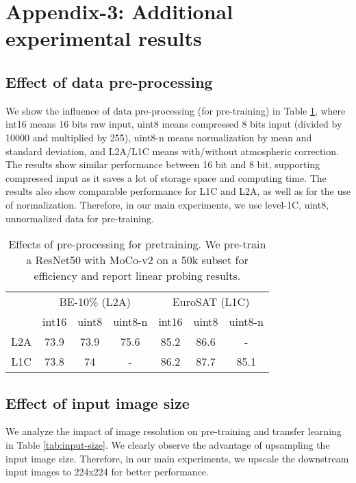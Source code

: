 \documentclass[lettersize,journal]{IEEEtran}
\begin{document}
\clearpage
\section*{\large\textbf{Appendix-3: Additional experimental results}}
\vspace{1em}

\label{subsec:pre-process}
\setcounter{subsection}{0}

\subsection{\textbf{Effect of data pre-processing}}
We show the influence of data pre-processing (for pre-training) in Table \ref{tab:pre-process}, where int16 means 16 bits raw input, uint8 means compressed 8 bits input (divided by 10000 and multiplied by 255), uint8-n means normalization by mean and standard deviation, and L2A/L1C means with/without atmospheric correction. The results show similar performance between 16 bit and 8 bit, supporting compressed input as it saves a lot of storage space and computing time. The results also show comparable performance for L1C and L2A, as well as for the use of normalization. Therefore, in our main experiments, we use level-1C, uint8, unnormalized data for pre-training.



\begin{table}[h!]
\centering
\caption{Effects of pre-processing for pretraining. We pre-train a ResNet50 with MoCo-v2 on a 50k subset for efficiency and report linear probing results.}

\begin{tabular}{ccccccc}
\hline
         & \multicolumn{3}{c}{BE-10\% (L2A)} & \multicolumn{3}{c}{EuroSAT (L1C)} \\
         & int16  & uint8  & uint8-n  & int16   & uint8  & uint8-n  \\ \hline \hline
L2A & 73.9   & 73.9   & 75.6     & 85.2    & 86.6   & -        \\
L1C & 73.8   & 74     & -        & 86.2    & 87.7   & 85.1     \\ \hline
\end{tabular}
\label{tab:pre-process}
\end{table}

\subsection{\textbf{Effect of input image size}}
We analyze the impact of image resolution on pre-training and transfer learning in Table \ref{tab:input-size}. We clearly observe the advantage of upsampling the input image size. Therefore, in our main experiments, we upscale the downstream input images to 224x224 for better performance.
\end{document}
